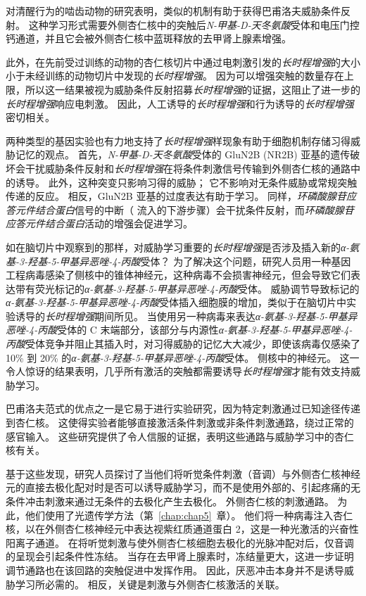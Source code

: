 对清醒行为的啮齿动物的研究表明，类似的机制有助于获得巴甫洛夫威胁条件反射。
这种学习形式需要外侧杏仁核中的突触后\textit{N-甲基-D-天冬氨酸}受体和电压门控钙通道，并且它会被外侧杏仁核中蓝斑释放的去甲肾上腺素增强。


此外，在先前受过训练的动物的杏仁核切片中通过电刺激引发的\textit{长时程增强}的大小小于未经训练的动物切片中发现的\textit{长时程增强}。
因为可以增强突触的数量存在上限，所以这一结果被视为威胁条件反射招募\textit{长时程增强}的证据，这阻止了进一步的\textit{长时程增强}响应电刺激。
因此，人工诱导的\textit{长时程增强}和行为诱导的\textit{长时程增强}密切相关。


两种类型的基因实验也有力地支持了\textit{长时程增强}样现象有助于细胞机制存储习得威胁记忆的观点。
首先，\textit{N-甲基-D-天冬氨酸}受体的 GluN2B (NR2B) 亚基的遗传破坏会干扰威胁条件反射和\textit{长时程增强}在将条件刺激信号传输到外侧杏仁核的通路中的诱导。
此外，这种突变只影响习得的威胁；
它不影响对无条件威胁或常规突触传递的反应。
相反，GluN2B 亚基的过度表达有助于学习。 同样，\textit{环磷酸腺苷应答元件结合蛋白}信号的中断（ 流入的下游步骤）会干扰条件反射，而\textit{环磷酸腺苷应答元件结合蛋白}活动的增强会促进学习。


如在脑切片中观察到的那样，对威胁学习重要的\textit{长时程增强}是否涉及插入新的\textit{α-氨基-3-羟基-5-甲基异恶唑-4-丙酸}受体？
为了解决这个问题，研究人员用一种基因工程病毒感染了侧核中的锥体神经元，这种病毒不会损害神经元，但会导致它们表达带有荧光标记的\textit{α-氨基-3-羟基-5-甲基异恶唑-4-丙酸}受体。
威胁调节导致标记的\textit{α-氨基-3-羟基-5-甲基异恶唑-4-丙酸}受体插入细胞膜的增加，类似于在脑切片中实验诱导的\textit{长时程增强}期间所见。
当使用另一种病毒来表达\textit{α-氨基-3-羟基-5-甲基异恶唑-4-丙酸}受体的 C 末端部分，该部分与内源性\textit{α-氨基-3-羟基-5-甲基异恶唑-4-丙酸}受体竞争并阻止其插入时，对习得威胁的记忆大大减少，即使该病毒仅感染了 10\% 到 20\% 的\textit{α-氨基-3-羟基-5-甲基异恶唑-4-丙酸}受体。
侧核中的神经元。 这一令人惊讶的结果表明，几乎所有激活的突触都需要诱导\textit{长时程增强}才能有效支持威胁学习。


巴甫洛夫范式的优点之一是它易于进行实验研究，因为特定刺激通过已知途径传递到杏仁核。
这使得实验者能够直接激活条件刺激或非条件刺激通路，绕过正常的感官输入。
这些研究提供了令人信服的证据，表明这些通路与威胁学习中的杏仁核有关。


基于这些发现，研究人员探讨了当他们将听觉条件刺激（音调）与外侧杏仁核神经元的直接去极化配对时是否可以诱导威胁学习，而不是使用外部的、引起疼痛的无条件冲击刺激来通过无条件的去极化产生去极化。
外侧杏仁核的刺激通路。 为此，他们使用了光遗传学方法（第~\ref{chap:chap5}~章）。
他们将一种病毒注入杏仁核，以在外侧杏仁核神经元中表达视紫红质通道蛋白 2，这是一种光激活的兴奋性阳离子通道。
在将听觉刺激与使外侧杏仁核细胞去极化的光脉冲配对后，仅音调的呈现会引起条件性冻结。
当存在去甲肾上腺素时，冻结量更大，这进一步证明调节通路也在该回路的突触促进中发挥作用。
因此，厌恶冲击本身并不是诱导威胁学习所必需的。
相反，关键是刺激与外侧杏仁核激活的关联。


